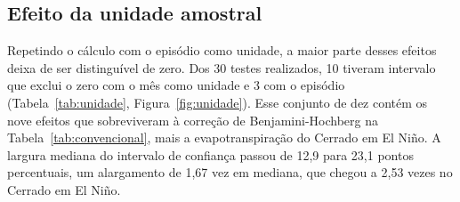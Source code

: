 \documentclass[a4paper,fleqn]{cas-sc}
\begin{document}
\subsection{Efeito da unidade amostral}

Repetindo o cálculo com o episódio como unidade, a maior parte desses efeitos deixa de ser distinguível de zero. Dos 30 testes realizados, 10 tiveram intervalo que exclui o zero com o mês como unidade e 3 com o episódio (Tabela~\ref{tab:unidade}, Figura~\ref{fig:unidade}). Esse conjunto de dez contém os nove efeitos que sobreviveram à correção de Benjamini-Hochberg na Tabela~\ref{tab:convencional}, mais a evapotranspiração do Cerrado em El Niño. A largura mediana do intervalo de confiança passou de 12,9 para 23,1 pontos percentuais, um alargamento de 1,67 vez em mediana, que chegou a 2,53 vezes no Cerrado em El Niño.
\end{document}
